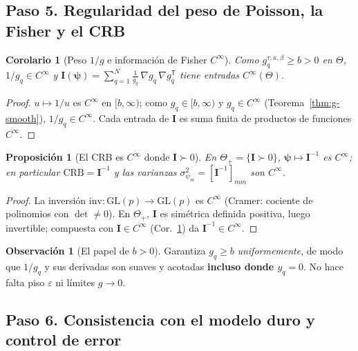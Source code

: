 \documentclass[11pt,a4paper]{article}
\theoremstyle{plain}
\newtheorem{proposition}[theorem]{Proposici\'on}
\newtheorem{corollary}[theorem]{Corolario}
\theoremstyle{definition}
\newtheorem{remark}{Observaci\'on}
\newcommand{\vect}[1]{\boldsymbol{#1}}
\newcommand{\matr}[1]{\mathbf{#1}}
\begin{document}
\subsection*{Paso 5. Regularidad del peso de Poisson, la Fisher y el CRB}
\label{sec:reg-fisher}

\begin{corollary}[Peso $1/g$ e informaci\'on de Fisher $C^\infty$]\label{cor:fisher}
Como $g^{\tau,\kappa,\beta}_q\ge b>0$ en $\Theta$, $1/g_q\in C^\infty$ y
$\matr{I}(\vect{\psi})=\sum_{q=1}^{N}\frac{1}{g_q}\,\nabla g_q\,\nabla g_q^{\mathsf T}$
tiene entradas $C^\infty(\Theta)$.
\end{corollary}
\begin{proof}
$u\mapsto1/u$ es $C^\infty$ en $[b,\infty)$; como $g_q\in[b,\infty)$ y $g_q\in
C^\infty$ (Teorema~\ref{thm:g-smooth}), $1/g_q\in C^\infty$. Cada entrada de
$\matr{I}$ es suma finita de productos de funciones $C^\infty$.
\end{proof}

\begin{proposition}[El CRB es $C^\infty$ donde $\matr{I}\succ0$]\label{prop:crb-smooth}
En $\Theta_+=\{\matr{I}\succ0\}$, $\vect{\psi}\mapsto\matr{I}^{-1}$ es $C^\infty$;
en particular $\mathrm{CRB}=\matr{I}^{-1}$ y las varianzas
$\sigma_{\psi_m}^2=[\matr{I}^{-1}]_{mm}$ son $C^\infty$.
\end{proposition}
\begin{proof}
La inversi\'on $\mathrm{inv}:\mathrm{GL}(p)\to\mathrm{GL}(p)$ es $C^\infty$ (Cramer:
cociente de polinomios con $\det\neq0$). En $\Theta_+$, $\matr{I}$ es
sim\'etrica definida positiva, luego invertible; compuesta con $\matr{I}\in
C^\infty$ (Cor.~\ref{cor:fisher}) da $\matr{I}^{-1}\in C^\infty$.
\end{proof}

\begin{remark}[El papel de $b>0$]
Garantiza $g_q\ge b$ \emph{uniformemente}, de modo que $1/g_q$ y sus derivadas
son suaves y acotadas \textbf{incluso donde $y_q=0$}. No hace falta piso
$\varepsilon$ ni l\'imites $g\to0$.
\end{remark}

\subsection*{Paso 6. Consistencia con el modelo duro y control de error}
\label{sec:consistencia}
\end{document}
